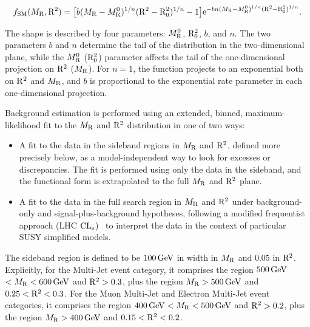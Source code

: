 \begin{equation}
 f_{\mathrm{SM}}(M_\mathrm{R},\mathrm{R}^2) =  \bigl[b(M_\mathrm{R}-{M_\mathrm{R}^0})^{1/n}(\mathrm{R}^2-{\mathrm{R}^2_0})
  ^{1/n}-1\bigr]\mathrm{e}^{-bn(M_\mathrm{R}-{M_\mathrm{R}^0})^{1/n}(\mathrm{R}^2-{\mathrm{R}^2_0})
    ^{1/n}} .
\label{eq:razFunction}
\end{equation}

The shape is described by four parameters: $M_\mathrm{R}^0$, $\mathrm{R}^2_0$, $b$, and $n$. 
The two parameters $b$ and $n$ determine the tail of the distribution in the 
two-dimensional plane, while the $M_\mathrm{R}^0$ ($\mathrm{R}^2_0$) parameter affects the tail of the 
one-dimensional projection on $\mathrm{R}^2$ ($M_\mathrm{R}$). For $n=1$, the function 
projects to an exponential both on $\mathrm{R}^2$ and $M_\mathrm{R}$, and $b$ is
proportional to the exponential rate parameter in each one-dimensional
projection. 

Background estimation is performed using an extended, binned, maximum-likelihood fit to the $M_\mathrm{R}$ and $\mathrm{R}^2$
distribution in one of two ways: 

\begin{itemize}
  \item A fit to the data in the sideband regions in $M_\mathrm{R}$ and 
    $\mathrm{R}^2$, defined more precisely below, as a model-independent way to look for excesses or 
    discrepancies. The fit is performed using only the data in the 
    sideband, and the functional form is extrapolated to the full $M_\mathrm{R}$ and $\mathrm{R}^2$ plane.
  \item A fit to the data in the full search region in $M_\mathrm{R}$ and $\mathrm{R}^2$ under  
    background-only and signal-plus-background hypotheses, following 
    a modified frequentist approach (LHC $\mathrm{CL}_\mathrm{s}$)~\cite{Read:2002hq,Read:2000ru,Cowan:2010js,ATLAS:2011tau} 
    to interpret the data in the context of particular SUSY simplified models. 
\end{itemize}

The sideband region is defined to be $100 \,\text{Ge\hspace{-.08em}V}$ in width in $M_\mathrm{R}$
and $0.05$ in $\mathrm{R}^2$. Explicitly, for the
Multi-Jet event category, it comprises the region $500 \,\text{Ge\hspace{-.08em}V}$
$< M_\mathrm{R} < 600 \,\text{Ge\hspace{-.08em}V}$ and $\mathrm{R}^2 > 0.3$, plus the region $M_\mathrm{R} > 500 \,\text{Ge\hspace{-.08em}V}$
and $0.25 < \mathrm{R}^2 < 0.3$.  For the Muon Multi-Jet and Electron Multi-Jet
event categories, it comprises the region $400 \,\text{Ge\hspace{-.08em}V} < M_\mathrm{R} < 500 \,\text{Ge\hspace{-.08em}V}$
and $\mathrm{R}^2 > 0.2$, plus the region $M_\mathrm{R} > 400 \,\text{Ge\hspace{-.08em}V}$ and
$0.15 < \mathrm{R}^2 < 0.2$. 

